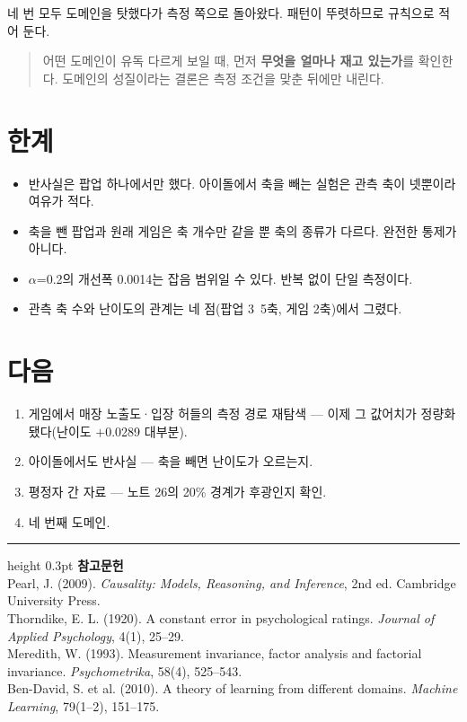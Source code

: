 \documentclass[10pt]{article}
\begin{document}
네 번 모두 도메인을 탓했다가 측정 쪽으로 돌아왔다. 패턴이 뚜렷하므로 규칙으로
적어 둔다.

\begin{quote}\fontsize{9.5}{11.5}\selectfont
어떤 도메인이 유독 다르게 보일 때, 먼저 \textbf{무엇을 얼마나 재고 있는가}를
확인한다. 도메인의 성질이라는 결론은 측정 조건을 맞춘 뒤에만 내린다.
\end{quote}

\section{한계}

\begin{itemize}[leftmargin=1.1em,itemsep=0.15em]
\item 반사실은 팝업 하나에서만 했다. 아이돌에서 축을 빼는 실험은 관측 축이 넷뿐이라
      여유가 적다.
\item 축을 뺀 팝업과 원래 게임은 축 개수만 같을 뿐 축의 종류가 다르다.
      완전한 통제가 아니다.
\item $\alpha$=0.2의 개선폭 0.0014는 잡음 범위일 수 있다. 반복 없이 단일 측정이다.
\item 관측 축 수와 난이도의 관계는 네 점(팝업 3~5축, 게임 2축)에서 그렸다.
\end{itemize}

\section{다음}

\begin{enumerate}[leftmargin=1.3em,itemsep=0.15em]
\item 게임에서 매장 노출도·입장 허들의 측정 경로 재탐색 --- 이제 그 값어치가
      정량화됐다(난이도 $+$0.0289 대부분).
\item 아이돌에서도 반사실 --- 축을 빼면 난이도가 오르는지.
\item 평정자 간 자료 --- 노트 26의 20\% 경계가 후광인지 확인.
\item 네 번째 도메인.
\end{enumerate}

\vspace{0.6em}
\hrule height 0.3pt
\vspace{0.5em}
{\footnotesize
\textbf{참고문헌}\\[0.3em]
Pearl, J. (2009). \emph{Causality: Models, Reasoning, and Inference}, 2nd ed.
Cambridge University Press.\\[0.15em]
Thorndike, E. L. (1920). A constant error in psychological ratings.
\emph{Journal of Applied Psychology}, 4(1), 25--29.\\[0.15em]
Meredith, W. (1993). Measurement invariance, factor analysis and factorial
invariance. \emph{Psychometrika}, 58(4), 525--543.\\[0.15em]
Ben-David, S. et al. (2010). A theory of learning from different domains.
\emph{Machine Learning}, 79(1--2), 151--175.
}
\end{document}

